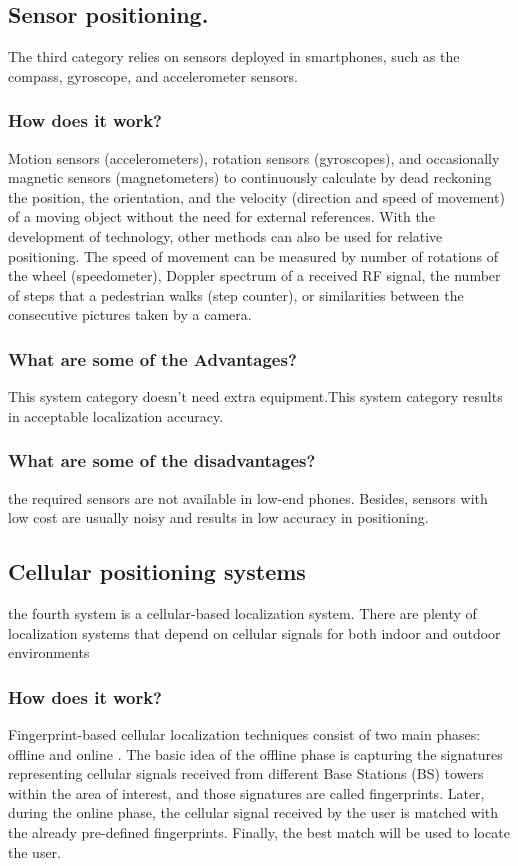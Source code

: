 \subsection{Sensor positioning.}
The third category relies on sensors deployed in smartphones, such as the compass, gyroscope, and accelerometer sensors.
\subsubsection{How does it work?}
Motion sensors (accelerometers), rotation sensors (gyroscopes), and occasionally magnetic sensors (magnetometers) to continuously calculate by dead reckoning the position, the orientation, and the velocity (direction and speed of movement) of a moving object without the need for external references. With the development of technology, other methods can also be used for relative positioning. The speed of movement can be measured by number of rotations of the wheel (speedometer), Doppler spectrum of a received RF signal, the number of steps that a pedestrian walks (step counter), or similarities between the consecutive pictures taken by a camera.\cite{Ying19}
\subsubsection{What are some of the Advantages?}
This system category doesn't need extra equipment.This system category results in acceptable localization accuracy. 
\subsubsection{What are some of the disadvantages?}
the required sensors are not available in low-end phones. Besides, sensors with low cost are usually noisy and results in low accuracy in positioning.
\subsection{Cellular positioning systems}
the fourth system is a cellular-based localization system. There are plenty of localization systems that depend on cellular signals for both indoor and outdoor environments 
\subsubsection{How does it work?}
Fingerprint-based cellular localization techniques consist of two main phases: offline and online \cite{6062428}. The basic idea of the offline phase is capturing the signatures representing cellular signals received from different Base Stations (BS) towers within the area of interest, and those signatures are called fingerprints. Later, during the online phase, the cellular signal received by the user is matched with the already pre-defined fingerprints. Finally, the best match will be used to locate the user.
